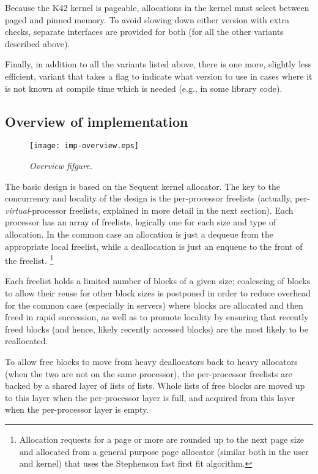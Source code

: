 \documentclass[dvips,11pt]{article}
\begin{document}
Because the K42 kernel is pageable, allocations in the kernel must
select between paged and pinned memory.  To avoid slowing down either
version with extra checks, separate interfaces are provided for both (for
all the other variants described above).

Finally, in addition to all the variants listed above, there is one more,
slightly less efficient, variant that takes a flag to indicate what version
to use in cases where it is not known at compile time which is needed
(e.g., in some library code).


\subsection{Overview of implementation}

\begin{figure}[t]
  \centerline{
    \texttt{[image: imp-overview.eps]}
    }
  \caption{\small\emph{Overview fifgure.}}
  \label{overview-imp:fig}
\end{figure}

The basic design is based on the Sequent kernel allocator.  The key to the
concurrency and locality of the design is the per-processor freelists
(actually, per-\emph{virtual}-processor freelists, explained in more detail
in the next section).  Each processor has an array of freelists, logically
one for each size and type of allocation.  In the common case an allocation
is just a dequeue from the appropriate local freelist, while a deallocation
is just an enqueue to the front of the freelist.  \footnote{Allocation
  requests for a page or more are rounded up to the next page size and
  allocated from a general purpose page allocator (similar both in the user
  and kernel) that uses the Stephenson fast first fit algorithm.}

Each freelist holds a limited number of blocks of a given size; coalescing
of blocks to allow their reuse for other block sizes is postponed in order
to reduce overhead for the common case (especially in servers) where blocks 
are allocated and then freed in rapid succession, as well as to promote
locality by ensuring that recently freed blocks (and hence, likely recently 
accessed blocks) are the most likely to be reallocated.

To allow free blocks to move from heavy deallocators back to heavy
allocators (when the two are not on the same processor), the per-processor
freelists are backed by a shared layer of lists of lists.  Whole lists of
free blocks are moved up to this layer when the per-processor layer is
full, and acquired from this layer when the per-processor layer is empty.
\end{document}
